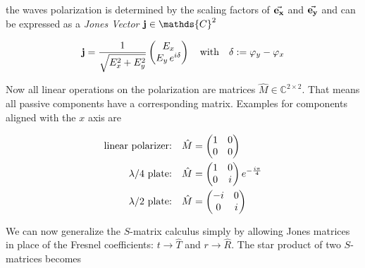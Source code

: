 \noindent
the waves polarization is determined by the scaling factors of $\va{e_x}$ and $\va{e_y}$ and can be expressed as a \textit{Jones Vector} $\vb j \in \mathds{C}^2$

\begin{equation}
   \vb j = \frac{1}{\sqrt{E_x^2 + E_y^2}}
   \begin{pmatrix}
       E_x\\
       E_y \, e^{i \delta}
   \end{pmatrix}
   \qq{with}
   \delta := \varphi_y - \varphi_x
\end{equation}

\noindent
Now all linear operations on the polarization are matrices $\hat{M} \in \mathds{C}^{2 \times 2}$. That means all passive components have a corresponding matrix. Examples for components aligned with the $x$ axis are


\begin{equation}
\begin{split}
   \qq*{linear polarizer:} \hat{M} &=
   \begin{pmatrix}
       1 & 0\\
       0 & 0
   \end{pmatrix}\\
   \qq*{$\lambda / 4$ plate:} \hat{M} &=
   \begin{pmatrix}
       1 & 0\\
       0 & i
   \end{pmatrix}
   e^{-\frac{i \pi}{4}}\\
   \qq*{$\lambda / 2$ plate:} \hat{M} &=
   \begin{pmatrix}
       -i & 0\\
       0 & i
   \end{pmatrix}\\
\end{split}
\end{equation}

We can now generalize the $S$-matrix calculus simply by allowing Jones matrices in place of the Fresnel coefficients: $t \rightarrow \hat T$ and $r \rightarrow \hat R$. The star product of two $S$-matrices becomes

